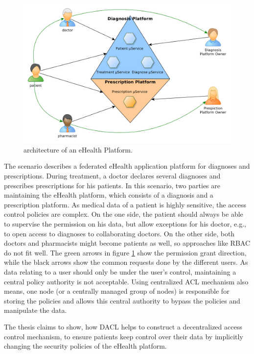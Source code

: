 \documentclass[12pt, conference]{IEEEtran}
\begin{document}
\begin{figure}[!h]
\centering
  \includegraphics[width=\linewidth]{figures/platform.png}
  \caption{architecture of an eHealth Platform.}
  \label{fig:platform}
\end{figure}

The scenario describes a federated eHealth application platform for diagnoses and prescriptions. During treatment, a doctor declares several diagnoses and prescribes prescriptions for his patients. In this scenario, two parties are maintaining the eHealth platform, which consists of a diagnosis and a prescription platform. As medical data of a patient is highly sensitive, the access control policies are complex. On the one side, the patient should always be able to supervise the permission on his data, but allow exceptions for his doctor, e.g., to open access to diagnoses to collaborating doctors. On the other side, both doctors and pharmacists might become patients as well, so approaches like RBAC do not fit well. The green arrows in figure \ref{fig:platform} show the permission grant direction, while the black arrows show the common requests done by the different users. As data relating to a user should only be under the user's control, maintaining a central policy authority is not acceptable. Using centralized ACL mechanism also means, one node (or a centrally managed group of nodes) is responsible for storing the policies and allows this central authority to bypass the policies and manipulate the data.

The thesis claims to show, how DACL helps to construct a decentralized access control mechanism, to ensure patients keep control over their data by implicitly changing the security policies of the eHealth platform.
\end{document}
